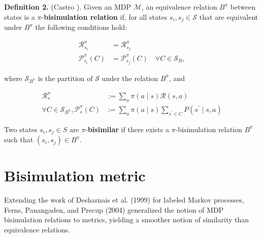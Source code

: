 \textbf{Definition 2.} (Castro \cite{castro2020scalable}). Given an MDP $\mathcal{M}$, an equivalence relation $B^\pi$ between states is a $\pi$-\textbf{bisimulation relation} if, for all states $s_i, s_j \in \mathcal{S}$ that are equivalent under $B^\pi$ the following conditions hold:


\begin{equation}
\begin{aligned}
\mathcal{R}_{s_i}^\pi & = \mathcal{R}_{s_j}^\pi
 \\
\mathcal{P}_{s_i}^\pi\left(C \right) & =\mathcal{P}_{s_j}^\pi\left(C\right) \quad \forall C \in \mathcal{S}_B,
\end{aligned}
\end{equation}

where $\mathcal{S}_{B^\pi}$ is the partition of $\mathcal{S}$ under the relation $B^\pi$, and

\begin{equation}
\begin{aligned}
\mathcal{R}_s^\pi & :=\sum_a \pi(a \mid s) \mathcal{R}(s, a) \\
\forall C \in \mathcal{S}_{B^\pi}, \mathcal{P}_s^\pi(C) & :=\sum_a \pi(a \mid s) \sum_{s^{\prime} \in C} P( s^{\prime} \mid s, a)
\end{aligned}
\end{equation}

Two states $s_i, s_j \in S$ are $\pi$-\textbf{bisimilar} if there exists a $\pi$-bisimulation relation $B^\pi$ such that $(s_i, s_j) \in B^\pi$.


\section{Bisimulation metric}

Extending the work of Desharnais et al. (1999) for labeled Markov processes, Ferns, Panangaden, and Precup (2004) generalized the notion of MDP bisimulation relations to metrics, yielding a smoother notion of similarity than equivalence relations. 


